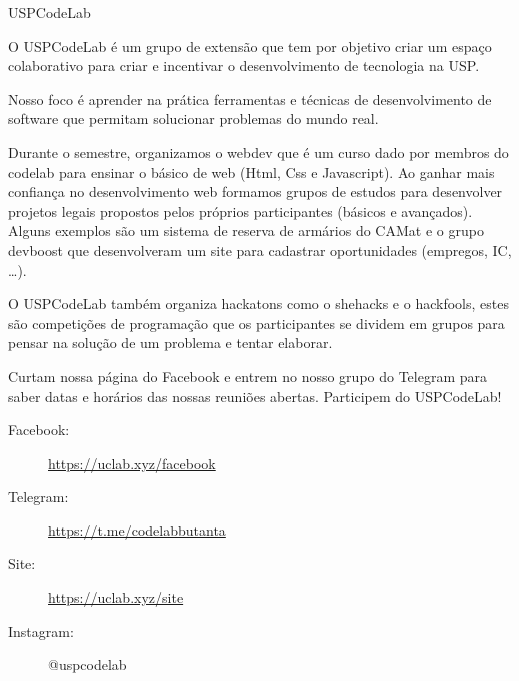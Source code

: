 \begin{subsecao}{USPCodeLab}


O USPCodeLab é um grupo de extensão que tem por objetivo criar um espaço
colaborativo para criar e incentivar o desenvolvimento de tecnologia na USP.

Nosso foco é aprender na prática ferramentas e técnicas de desenvolvimento de software que permitam
solucionar problemas do mundo real.

Durante o semestre, organizamos o webdev que é um curso dado por membros do codelab para ensinar o
básico de web (Html, Css e Javascript). Ao ganhar mais confiança no desenvolvimento web formamos
grupos de estudos para desenvolver projetos legais propostos pelos próprios participantes (básicos
e avançados). Alguns exemplos são um sistema de reserva de armários do CAMat e o grupo devboost que
desenvolveram um site para cadastrar oportunidades (empregos, IC, \dots). 

O USPCodeLab também organiza hackatons como o shehacks e o hackfools, estes são competições de
programação que os participantes se dividem em grupos para pensar na solução de um problema e tentar
elaborar.

Curtam nossa página do Facebook e entrem no nosso grupo do Telegram para saber
datas e horários das nossas reuniões abertas. Participem do USPCodeLab!

\begin{description}
\item[Facebook:] \url{https://uclab.xyz/facebook}
\item[Telegram:] \url{https://t.me/codelabbutanta}
\item[Site:] \url{https://uclab.xyz/site}
\item[Instagram:] @uspcodelab
\end{description}

\end{subsecao}
